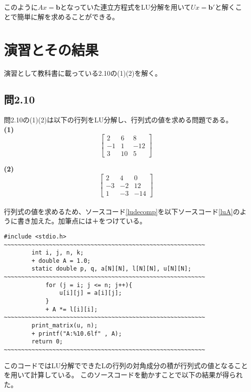 \documentclass[a4paper,11pt]{jsarticle}
\begin{document}
このように$Ax=\textbf{b}$となっていた連立方程式をLU分解を用いて$Ux=\textbf{b}'$と解くことで簡単に解を求めることができる。

\section{演習とその結果}
演習として教科書に載っている2.10の(1)(2)を解く。
\subsection{問2.10}
問2.10の(1)(2)は以下の行列をLU分解し、行列式の値を求める問題である。\\

\textbf{(1)}
\begin{equation}
    \begin{bmatrix}
        2 & 6 & 8 \\ 
        -1 & 1 & -12 \\ 
        3 & 10 & 5
    \end{bmatrix}
\end{equation}

\textbf{(2)}
\begin{equation}
    \begin{bmatrix}
        2 & 4 & 0 \\ 
        -3 & -2 & 12 \\ 
        1 & -3 & -14
    \end{bmatrix}
\end{equation}
\\

行列式の値を求めるため、ソースコード\ref{ludecomp}を以下ソースコード\ref{luA}のように書き加えた。加筆点には＋をつけている。

\begin{lstlisting}[caption=ludecomp\_A.c, label=luA]
    #include <stdio.h>
~~~~~~~~~~~~~~~~~~~~~~~~~~~~~~~~~~~~~~~~~~~~~~~~~~~~~~~~~~
        int i, j, n, k;
        + double A = 1.0;
        static double p, q, a[N][N], l[N][N], u[N][N];
~~~~~~~~~~~~~~~~~~~~~~~~~~~~~~~~~~~~~~~~~~~~~~~~~~~~~~~~~~
            for (j = i; j <= n; j++){
                u[i][j] = a[i][j];
            }
            + A *= l[i][i];
~~~~~~~~~~~~~~~~~~~~~~~~~~~~~~~~~~~~~~~~~~~~~~~~~~~~~~~~~~
        print_matrix(u, n);
        + printf("A:%10.6lf" , A);
        return 0;
~~~~~~~~~~~~~~~~~~~~~~~~~~~~~~~~~~~~~~~~~~~~~~~~~~~~~~~~~~
\end{lstlisting}

このコードではLU分解でできたLの行列の対角成分の積が行列式の値となることを用いて計算している。
このソースコードを動かすことで以下の結果が得られた。
\end{document}
